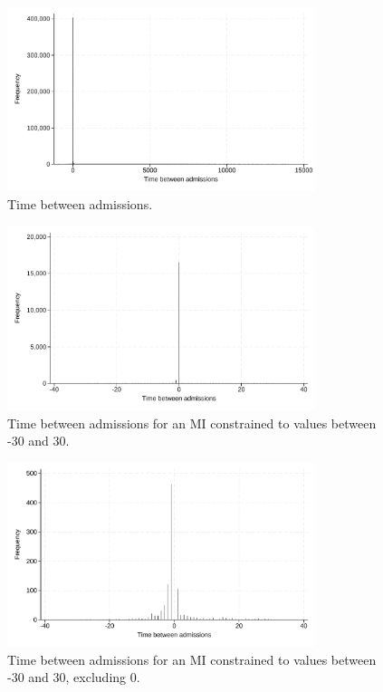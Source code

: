 \documentclass[11pt]{article}
\begin{document}
\color{Blue4}
\begin{figure}[h!]
    \centering
    \caption{Time between admissions.}
    \label{transferhist1}
    \includegraphics[width=0.8\textwidth]{HA_log/18.pdf}
\end{figure}
\begin{figure}[h!]
    \centering
    \caption{Time between admissions for an MI constrained to values between -30 and 30.}
    \label{transferhist2}
    \includegraphics[width=0.8\textwidth]{HA_log/18_1.pdf}
\end{figure}
\begin{figure}[h!]
    \centering
    \caption{Time between admissions for an MI constrained to values between -30 and 30, excluding 0.}
    \label{transferhist3}
    \includegraphics[width=0.8\textwidth]{HA_log/18_2.pdf}
\end{figure}
\begin{stlog}\end{stlog}
\color{black}
\end{document}
